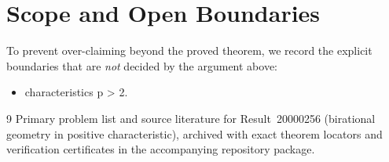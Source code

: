 \documentclass[10pt,reqno]{amsart}
\theoremstyle{definition}
\begin{document}
\section{Scope and Open Boundaries}

To prevent over-claiming beyond the proved theorem, we record the explicit boundaries that are \emph{not} decided by the argument above:
\begin{itemize}
  \item characteristics p > 2.
\end{itemize}

\begin{thebibliography}{9}
Primary problem list and source literature for Result~20000256 (birational geometry in positive characteristic), archived with exact theorem locators and verification certificates in the accompanying repository package.
\end{thebibliography}
\end{document}
